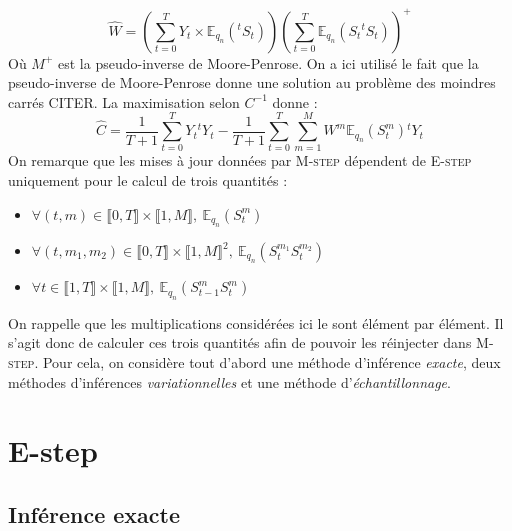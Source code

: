 \documentclass[10pt,a4paper]{article}
\newcommand{\Estep}{\textsc{E-step}}
\newcommand{\Mstep}{\textsc{M-step}}
\begin{document}
\begin{equation}
  \widehat{W}=\left( \underset{t=0}{\overset{T}{\sum}} Y_t \times 
  \mathbb{E}_{q_n}({}^tS_t) \right) \left( \underset{t=0}{\overset{T}{\sum}} 
  \mathbb{E}_{q_n}\left( S_t {}^t S_t\right)\right)^+
\end{equation}
Où $M^+$ est la pseudo-inverse de Moore-Penrose. On a ici utilisé le fait que 
la pseudo-inverse de Moore-Penrose donne une solution au problème des moindres 
carrés CITER. La maximisation selon $C^{-1}$ donne :
\begin{equation}
\widehat{C}=\frac{1}{T+1}\underset{t=0}{\overset{T}{\sum}}Y_t 
{}^tY_t-\frac{1}{T+1}\underset{t=0}{\overset{T}{\sum}}\underset{m=1}{\overset{M}
{\sum}}W^m\mathbb{E}_{q_n}(S_t^m){}^t Y_t
\end{equation}
On remarque que les mises à jour données par \Mstep{} dépendent de \Estep{} 
uniquement pour le calcul de trois quantités :
\begin{itemize}
\item $\forall (t,m) \in \llbracket 0, T\rrbracket \times \llbracket 1,M 
\rrbracket, \ \mathbb{E}_{q_n}(S_t^m) $
\item $\forall (t,m_1,m_2) \in \llbracket 0, T\rrbracket \times \llbracket 
1,M\rrbracket^2, \ \mathbb{E}_{q_n}(S_t^{m_1}S_t^{m_2}) $
\item $\forall t \in \llbracket 1,T \rrbracket \times \llbracket 1,M 
\rrbracket, \ \mathbb{E}_{q_n}(S_{t-1}^mS_t^{m})$
\end{itemize}
On rappelle que les multiplications considérées ici le sont élément par 
élément. Il s'agit donc de calculer ces trois quantités afin de pouvoir les 
réinjecter dans \Mstep. Pour cela, on considère tout d'abord une méthode
d'inférence \emph{exacte}, deux méthodes d'inférences \emph{variationnelles} et
une méthode d'\emph{échantillonnage}.

\section{E-step}

\subsection{Inférence exacte}
\end{document}

